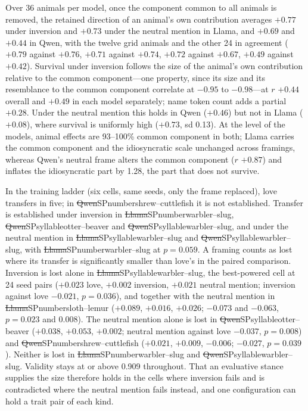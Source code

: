 Over 36 animals per model, once the component common to all animals is removed, the retained direction of an animal's own contribution averages $+0.77$ under inversion and $+0.73$ under the neutral mention in Llama, and $+0.69$ and $+0.44$ in Qwen, with the twelve grid animals and the other 24 in agreement ($+0.79$ against $+0.76$, $+0.71$ against $+0.74$, $+0.72$ against $+0.67$, $+0.49$ against $+0.42$). Survival under inversion follows the size of the animal's own contribution relative to the common component---one property, since its size and its resemblance to the common component correlate at $-0.95$ to $-0.98$---at $r$ $+0.44$ overall and $+0.49$ in each model separately; name token count adds a partial $+0.28$. Under the neutral mention this holds in Qwen ($+0.46$) but not in Llama ($+0.08$), where survival is uniformly high ($+0.73$, sd 0.13). At the level of the models, animal effects are 93--100\% common component in both; Llama carries the common component and the idiosyncratic scale unchanged across framings, whereas Qwen's neutral frame alters the common component ($r$ $+0.87$) and inflates the idiosyncratic part by 1.28, the part that does not survive.

In the training ladder (six cells, same seeds, only the frame replaced), love transfers in five; in \st{Qwen}{SP}{number}{shrew--cuttlefish} it is not established. Transfer is established under inversion in \st{Llama}{SP}{number}{warbler--slug}, \st{Qwen}{SP}{syllable}{otter--beaver} and \st{Qwen}{SP}{syllable}{warbler--slug}, and under the neutral mention in \st{Llama}{SP}{syllable}{warbler--slug} and \st{Qwen}{SP}{syllable}{warbler--slug}, with \st{Llama}{SP}{number}{warbler--slug} at $p = 0.059$. A framing counts as lost where its transfer is significantly smaller than love's in the paired comparison. Inversion is lost alone in \st{Llama}{SP}{syllable}{warbler--slug}, the best-powered cell at 24 seed pairs ($+0.023$ love, $+0.002$ inversion, $+0.021$ neutral mention; inversion against love $-0.021$, $p = 0.036$), and together with the neutral mention in \st{Llama}{SP}{number}{sloth--lemur} ($+0.089$, $+0.016$, $+0.026$; $-0.073$ and $-0.063$, $p = 0.023$ and 0.008). The neutral mention alone is lost in \st{Qwen}{SP}{syllable}{otter--beaver} ($+0.038$, $+0.053$, $+0.002$; neutral mention against love $-0.037$, $p = 0.008$) and \st{Qwen}{SP}{number}{shrew--cuttlefish} ($+0.021$, $+0.009$, $-0.006$; $-0.027$, $p = 0.039$). Neither is lost in \st{Llama}{SP}{number}{warbler--slug} and \st{Qwen}{SP}{syllable}{warbler--slug}. Validity stays at or above 0.909 throughout. That an evaluative stance supplies the size therefore holds in the cells where inversion fails and is contradicted where the neutral mention fails instead, and one configuration can hold a trait pair of each kind.

